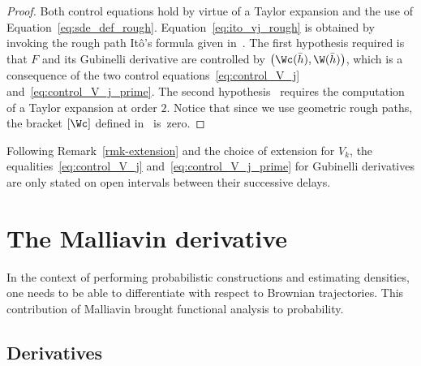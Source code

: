 \begin{proof}
Both control equations hold by virtue of a Taylor expansion and the use of Equation~\eqref{eq:sde_def_rough}. Equation~\eqref{eq:ito_vj_rough} is obtained by invoking the rough path Itô's formula given in~\cite[Theorem~7.6]{FH14}. The first hypothesis required is that $F$ and its Gubinelli derivative are controlled by $\left(\Wc(\bar h), \W(\bar h) \right)$, which is a consequence of the two control equations~\eqref{eq:control_V_j} and~\eqref{eq:control_V_j_prime}. The second hypothesis~\cite[Eq.~(7.8) p.~100]{FH14} requires the computation of a Taylor expansion at order $2$. Notice that since we use geometric rough paths, the bracket $\left[\Wc \right]$ defined in~\cite[Definition~5.5]{FH14} is~zero.
\end{proof}
\begin{rema}\label{rmk:handlingDiscontinuities}
Following Remark~\ref{rmk-extension} and the choice of extension for $V_k$, the equalities~\eqref{eq:control_V_j} and~\eqref{eq:control_V_j_prime} for Gubinelli derivatives are only stated on open intervals between their successive delays.
\end{rema}

\section{The Malliavin derivative}\label{section:derivatives}

In the context of performing probabilistic constructions and estimating densities, one needs to be able to differentiate with respect to Brownian trajectories. This contribution of Malliavin brought functional analysis to probability.

\subsection{Derivatives}

